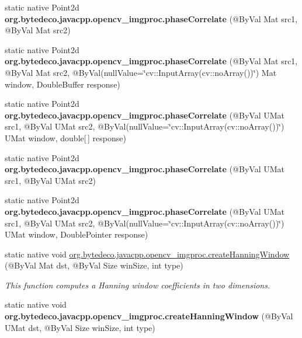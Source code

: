 \begin{DoxyCompactItemize}
static native Point2d {\bfseries org.\+bytedeco.\+javacpp.\+opencv\+\_\+imgproc.\+phase\+Correlate} (@By\+Val Mat src1, @By\+Val Mat src2)
\item 
\mbox{\label{group__imgproc__motion_gaa974482d5ffb2c114c69afc528bd4136}} 
static native Point2d {\bfseries org.\+bytedeco.\+javacpp.\+opencv\+\_\+imgproc.\+phase\+Correlate} (@By\+Val Mat src1, @By\+Val Mat src2, @By\+Val(null\+Value=\char`\"{}cv\+::\+Input\+Array(cv\+::no\+Array())\char`\"{}) Mat window, Double\+Buffer response)
\item 
\mbox{\label{group__imgproc__motion_gab66282963fa313e0a8acf2a6f1ea6589}} 
static native Point2d {\bfseries org.\+bytedeco.\+javacpp.\+opencv\+\_\+imgproc.\+phase\+Correlate} (@By\+Val U\+Mat src1, @By\+Val U\+Mat src2, @By\+Val(null\+Value=\char`\"{}cv\+::\+Input\+Array(cv\+::no\+Array())\char`\"{}) U\+Mat window, double\mbox{[}$\,$\mbox{]} response)
\item 
\mbox{\label{group__imgproc__motion_gac8c9f0508bb0b17570745eae693a7857}} 
static native Point2d {\bfseries org.\+bytedeco.\+javacpp.\+opencv\+\_\+imgproc.\+phase\+Correlate} (@By\+Val U\+Mat src1, @By\+Val U\+Mat src2)
\item 
\mbox{\label{group__imgproc__motion_ga11ed5dbb33540339afb1af535d8566af}} 
static native Point2d {\bfseries org.\+bytedeco.\+javacpp.\+opencv\+\_\+imgproc.\+phase\+Correlate} (@By\+Val U\+Mat src1, @By\+Val U\+Mat src2, @By\+Val(null\+Value=\char`\"{}cv\+::\+Input\+Array(cv\+::no\+Array())\char`\"{}) U\+Mat window, Double\+Pointer response)
\item 
static native void \hyperlink{group__imgproc__motion_ga219e0d1d1f1b5935a730317fc2f4d0d9}{org.\+bytedeco.\+javacpp.\+opencv\+\_\+imgproc.\+create\+Hanning\+Window} (@By\+Val Mat dst, @By\+Val Size win\+Size, int type)
\begin{DoxyCompactList}\small\item\em This function computes a Hanning window coefficients in two dimensions. \end{DoxyCompactList}\item 
\mbox{\label{group__imgproc__motion_ga530f8b1d48230476eb9b1134e725f898}} 
static native void {\bfseries org.\+bytedeco.\+javacpp.\+opencv\+\_\+imgproc.\+create\+Hanning\+Window} (@By\+Val U\+Mat dst, @By\+Val Size win\+Size, int type)
\end{DoxyCompactItemize}



